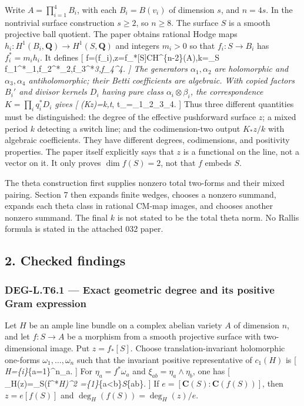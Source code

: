 \documentclass[11pt,a4paper]{article}
\theoremstyle{definition}
\begin{document}
Write \(A=\prod_{i=1}^4B_i\), with each \(B_i=B(v_i)\) of dimension
\(s\), and \(n=4s\). In the nontrivial surface construction \(s\ge2\),
so \(n\ge8\). The surface \(S\) is a smooth projective ball quotient.
The paper obtains rational Hodge maps
\(h_i:H^1(B_i,\mathbf Q)\to H^1(S,\mathbf Q)\) and integers \(m_i>0\) so
that \(f_i:S\to B_i\) has \(f_i^*=m_i h_i\). It defines {[}
f=(f\_i),\quad z=f\_*{[}S{]}\in CH\^{}\{n-2\}(A),\quad k=\int\_S
f\_1\^{}*\alpha\_1,f\_2\^{}*\alpha\_2,f\_3\^{}*\alpha\emph{3,f\_4\^{}\emph{\alpha\emph{4.
{]} The generators \(\alpha_1,\alpha_2\) are holomorphic and
\(\alpha_3,\alpha_4\) antiholomorphic; their Betti coefficients are
algebraic. With copied factors \(B_i'\) and divisor kernels \(D_i\)
having pure class \(\alpha_i\otimes\beta_i\), the correspondence
\(K=\prod_i q_i^*D_i\) gives {[} (K}}z)=k,t}\beta,
\qquad t\_\beta=\beta\_1\otimes\beta\_2\otimes\beta\_3\otimes\beta\_4.
{]} Thus three different quantities must be distinguished: the degree of
the effective pushforward surface \(z\); a mixed period \(k\) detecting
a switch line; and the codimension-two output \(K_*z/k\) with algebraic
coefficients. They have different degrees, codimensions, and positivity
properties. The paper itself explicitly says that \(z\) is a functional
on the line, not a vector on it. It only proves \(\dim f(S)=2\), not
that \(f\) embeds \(S\).

The theta construction first supplies nonzero total two-forms and their
mixed pairing. Section 7 then expands finite wedges, chooses a nonzero
summand, expands each theta class in rational CM-map images, and chooses
another nonzero summand. The final \(k\) is not stated to be the total
theta norm. No Rallis formula is stated in the attached 032 paper.

\subsection{2. Checked findings}\label{checked-findings}

\subsubsection{DEG-L.T6.1 --- Exact geometric degree and its positive
Gram
expression}\label{deg-l.t6.1-exact-geometric-degree-and-its-positive-gram-expression}

Let \(H\) be an ample line bundle on a complex abelian variety \(A\) of
dimension \(n\), and let \(f:S\to A\) be a morphism from a smooth
projective surface with two-dimensional image. Put \(z=f_*[S]\). Choose
translation-invariant holomorphic one-forms \(\omega_1,\ldots,\omega_n\)
such that the invariant positive representative of \(c_1(H)\) is {[}
\Omega\emph{H=\{i\}\sum}\{a=1\}\^{}n\omega\_a\wedge{}.
{]} For \(\eta_a=f^*\omega_a\) and \(\xi_{ab}=\eta_a\wedge\eta_b\), one
has {[} \deg\_H(z)=\int\_S(f\^{}*\Omega\emph{H)\^{}2
=\{1\}\sum}\{a\textless b\}\int\emph{S\xi}\{ab\}\wedge{}.
 {]} If \(e=[\mathbf C(S):\mathbf C(f(S))]\), then \(z=e[f(S)]\)
and \(\deg_H(f(S))=\deg_H(z)/e\).
\end{document}
